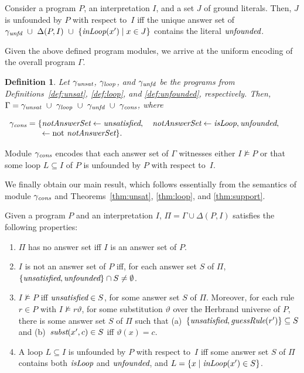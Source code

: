 \documentclass{tlp}
\newcommand{\reif}[1]{\Delta(#1)}
\newcommand{\naf}{\mathrm{not}}
\newcommand{\subst}{\vartheta}
\newcommand{\wrt}{with respect to}
\newcommand{\INPUT}{\reif{P,I}}
\newcommand{\Unsat}{\mathit{UNSAT}} \newcommand{\UnsatGuess}{\mathit{UNSAT_{guess}}} \newcommand{\UnsatCheck}{\mathit{UNSAT_{check}}} \newcommand{\UnsatAux}{\mathit{UNSAT_{aux}}} \renewcommand{\Unsat}{\gamma_\mathit{unsat}} \renewcommand{\UnsatGuess}{\Unsat^\mathit{guess}} \renewcommand{\UnsatCheck}{\Unsat^\mathit{check}} \renewcommand{\UnsatAux}{\Unsat^\mathit{aux}}
\newcommand{\Loop}{\mathit{LOOP}} \newcommand{\LoopGuess}{\mathit{LOOP_{guess}}} \newcommand{\LoopCheck}{\mathit{LOOP_{check}}} \newcommand{\LoopAux}{\mathit{LOOP_{aux}}} \renewcommand{\Loop}{\gamma_\mathit{loop}} \renewcommand{\LoopGuess}{\Loop^\mathit{guess}} \renewcommand{\LoopCheck}{\Loop^\mathit{check}} \renewcommand{\LoopAux}{\Loop^\mathit{aux}}
\newcommand{\Support}{\mathit{SUPPORT}} \newcommand{\SupportGuess}{\mathit{SUPPORT_{guess}}} \newcommand{\SupportCheck}{\mathit{SUPPORT_{check}}} \newcommand{\SupportAux}{\mathit{SUPPORT_{aux}}} \renewcommand{\Support}{\gamma_\mathit{unfd}} \renewcommand{\SupportGuess}{\Support^\mathit{guess}} \renewcommand{\SupportCheck}{\Support^\mathit{check}} \renewcommand{\SupportAux}{\Support^\mathit{aux}}
\newcommand{\Cons}{\mathit{CONS}}
\renewcommand{\Cons}{\gamma_\mathit{cons}}
\renewcommand{\mathit}[1]{{\text{\it{#1}}}}
\newtheorem{definition}{Definition}
\begin{document}
\begin{theorem}\label{thm:support}
Consider a program $P$, an interpretation $I$, and a set $J$ of ground literals. Then,
$J$ is unfounded by $P$ \wrt\ $I$ iff
the unique answer set of $\Support\ \cup\ \INPUT\ \cup\ \{\mathit{inLoop}(x') \mid x \in J\}$ contains the literal $\mathit{unfounded}$.
\end{theorem}

Given the above defined program modules, 
we arrive at the  uniform  encoding of the overall program $\Gamma$.

\begin{definition}
Let $\Unsat$, $\Loop$, and $\Support$ be the programs from Definitions~\ref{def:unsat}, \ref{def:loop}, and \ref{def:unfounded}, respectively. Then,  
$\Gamma = \Unsat\ \cup\ \Loop\ \cup\ \Support\ \cup\ \Cons$, {where}
\begin{center}
$\begin{array}{r@{}l}
 \Cons  =  
 \{ & \mathit{notAnswerSet} \leftarrow \mathit{unsatisfied},
\quad \mathit{notAnswerSet} \leftarrow \mathit{isLoop}, \mathit{unfounded}, 
\\
&\leftarrow \naf\ \mathit{notAnswerSet} \}\mbox{.} 
\end{array}$
\end{center}
\end{definition}

Module $\Cons$ encodes that each answer set of $\Gamma$ witnesses either $I \not\models P$ or that some loop $L \subseteq I$ of $P$ is unfounded by $P$ \wrt\ $I$. 

We finally obtain our main result, which follows essentially from the semantics of module $\Cons$ and
Theorems~\ref{thm:unsat}, \ref{thm:loop}, and \ref{thm:support}.

\begin{theorem}\label{th:main}
Given a program $P$ and an interpretation $I$, $\Pi=\Gamma \cup \INPUT$ satisfies the following properties:
\begin{enumerate}[\rm(i)]

\item  $\Pi$ has no answer set iff $I$ is an answer set of $P$.

\item $I$ is not an answer set of $P$ iff, for each answer set $S$ of  $\Pi$, $\{\mathit{unsatisfied},\mathit{unfounded}\}\cap S\neq\emptyset$.

\item $I \not\models P$ iff $\mathit{unsatisfied}\in S$, for some answer set $S$ of $\Pi$.
Moreover, for each rule  $r \in P$  with $I \not\models r\subst$, for some substitution $\subst$ over the Herbrand universe of $P$, there is some answer set $S$ of $\Pi$ such that (a)~$\{\mathit{unsatisfied},\mathit{guessRule}(r')\}\subseteq S$ 
and (b)~$\mathit{subst}(x',c)\in S$ iff $\subst(x) = c$.

\item A loop $L \subseteq I$ is unfounded by $P$ \wrt\ $I$ iff some answer set $S$ of $\Pi$ 
contains both $\mathit{isLoop}$ and $\mathit{unfounded}$, and
$L = \{x \mid \mathit{inLoop}(x') \in S\}$.
\end{enumerate}
\end{theorem}
\end{document}
